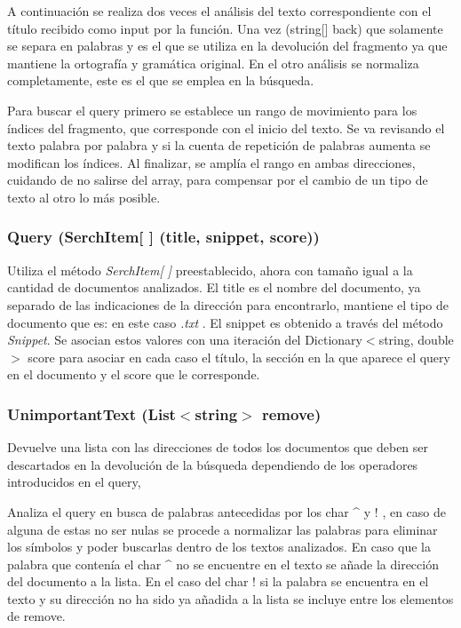 \documentclass[a4paper,12pt,]{article}
\begin{document}
A continuación se realiza dos veces el análisis del texto correspondiente con el título recibido como input por 
la función. Una vez (string[] back) que solamente se separa en palabras y es el que se utiliza en la devolución 
del fragmento ya que mantiene la ortografía y gramática original. En el otro análisis se normaliza completamente, 
este es el que se emplea en la búsqueda.

Para buscar el query primero se establece un rango de movimiento para los índices del fragmento, que corresponde 
con el inicio del texto. Se va revisando el texto palabra por palabra y si la cuenta de repetición de palabras 
aumenta se modifican los índices. Al finalizar, se amplía el rango en ambas direcciones, cuidando de no salirse 
del array, para compensar por el cambio de un tipo de texto al otro lo más posible.

\subsubsection*{Query (SerchItem[ ] (title, snippet, score))}
Utiliza el método \textit{SerchItem[ ]} preestablecido, ahora con tamaño igual a la cantidad de documentos analizados. 
El title es el nombre del documento, ya separado de las indicaciones de la dirección para encontrarlo, mantiene el 
tipo de documento que es: en este caso \textit{.txt} . El snippet es obtenido a través del método \textit{Snippet}. 
Se asocian estos valores con una iteración del Dictionary$<$string, double$>$ score para asociar en cada caso el 
título, la sección en la que aparece el query en el documento y el score que le corresponde.

\subsubsection*{UnimportantText (List$<$string$>$ remove)}
Devuelve una lista con las direcciones de todos los documentos que deben ser descartados en la devolución de la 
búsqueda dependiendo de los operadores introducidos en el query,

Analiza el query en busca de palabras antecedidas por los char \^{} y ! , en caso de alguna de estas no ser nulas 
se procede a normalizar las palabras para eliminar los símbolos y poder buscarlas dentro de los textos analizados. 
En caso que la palabra que contenía el char \^{} no se encuentre en el texto se añade la dirección del documento a 
la lista. En el caso del char ! si la palabra se encuentra en el texto y su dirección no ha sido ya añadida a la 
lista se incluye entre los elementos de remove.
\end{document}
